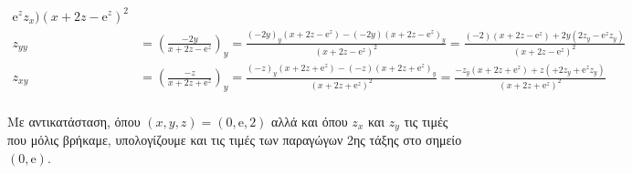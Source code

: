 \begin{solution}
\begin{align*}
{        \mathrm{e}^{z} z_{x})}{(x+2z- \mathrm{e}^{z})^{2}}  \\ 
        z_{yy} &= \left(\frac{-2y}{x+2z- \mathrm{e}^{z}}\right)_{y} = 
        \frac{(-2y)_{y}(x+2z- \mathrm{e}^{z})- (-2y)(x+2z- \mathrm{e}^{z} )_{y}}{(x+2z-
          \mathrm{e}^{z} )^{2}} = \frac{(-2)(x+2z- \mathrm{e}^{z} )+2y(2z_{y}-
        \mathrm{e}^{z} z_{y})}{(x+2z- \mathrm{e}^{z})^{2}} \\  
        z_{xy}&= \left(\frac{-z}{x+2z+ \mathrm{e}^{z}}\right)_{y} = 
        \frac{(-z)_{y}(x+2z+ \mathrm{e}^{z})-(-z)(x+2z+ \mathrm{e}^{z} )_{y}}{(x+2z+
          \mathrm{e}^{z})^{2}} = \frac{-z_{y}(x+2z+ \mathrm{e}^{z})+z(+2z_{y}+ 
        \mathrm{e}^{z} z_{y})}{(x+2z+ \mathrm{e}^{z})^{2}}  \\ 
      \end{align*} 
    \end{solution}

    Με αντικατάσταση, όπου $ (x,y,z)=(0, \mathrm{e}, 2) $ αλλά και όπου $ z_{x}$ και 
    $ z_{y} $ τις τιμές που μόλις βρήκαμε, υπολογίζουμε και τις τιμές των παραγώγων 2ης
    τάξης στο σημείο $ (0, \mathrm{e}) $.

    \enlargethispage{\baselineskip}



